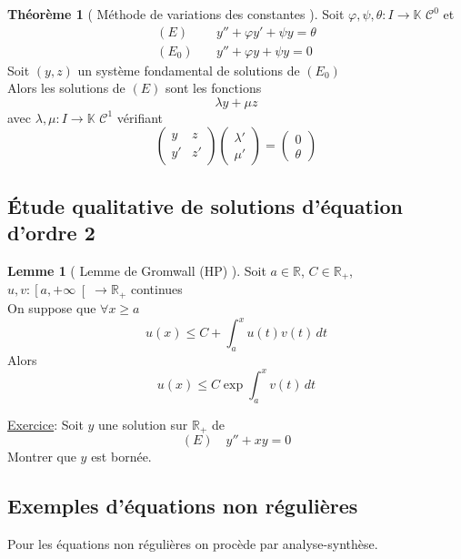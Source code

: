 \documentclass[10pt,a4paper]{article}
\theoremstyle{definition}
\newtheorem{theorem}[proposition]{Théorème}
\newtheorem{lemma}[proposition]{Lemme}
\begin{document}
\begin{theorem}[ Méthode de variations des constantes ]
    Soit \(\varphi, \psi, \theta: I \to \mathbb{K}\) \(\mathcal{C}^0\) et
    \begin{align*}
        (E)& \quad y'' + \varphi y' + \psi y = \theta \\
        (E_0)& \quad y'' + \varphi y + \psi y = 0
    \end{align*}
    Soit \((y, z)\) un système fondamental de solutions de \((E_0)\) \\
    Alors les solutions de \((E)\) sont les fonctions
    \[\boxed{\lambda y + \mu z}\] 
    avec \(\lambda, \mu: I \to \mathbb{K}\) \(\mathcal{C}^1\) vérifiant
    \[\boxed{\begin{pmatrix}
        y & z \\
        y' & z'
    \end{pmatrix} \begin{pmatrix}
        \lambda ' \\
        \mu'
    \end{pmatrix} = \begin{pmatrix}
        0 \\
        \theta
    \end{pmatrix}}\]
\end{theorem}

\subsection{Étude qualitative de solutions d'équation d'ordre 2}
\begin{lemma}[ Lemme de Gromwall (HP) ]
    Soit \(a \in \mathbb{R} \), \(C \in \mathbb{R}_+\), \(u, v: \left[ a, +\infty \right[ \to \mathbb{R}_+\) continues \\
    On suppose que \(\forall x \geq a\)
    \[u(x) \leq C + \int_{a}^{x} u(t) v(t) \, dt\]
    Alors
    \[\boxed{u(x) \leq C \exp \int_{a}^{x} v(t) \, dt}\]
\end{lemma}

\noindent \uline{Exercice}: Soit \(y\) une solution sur \(\mathbb{R}_+\) de
\[(E) \quad y'' + xy = 0\]
Montrer que \(y\) est bornée.

\subsection{Exemples d'équations non régulières}
\noindent Pour les équations non régulières on procède par analyse-synthèse. \medskip
\end{document}
